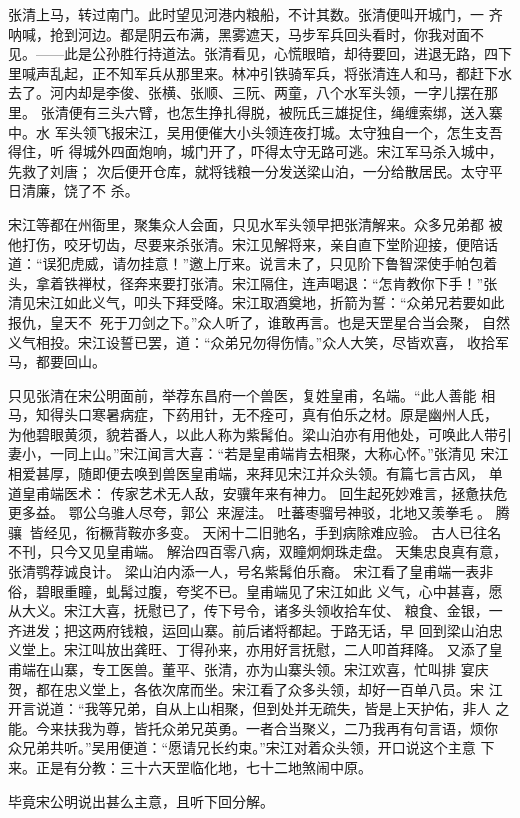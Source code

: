 张清上马，转过南门。此时望见河港内粮船，不计其数。张清便叫开城门，一
齐呐喊，抢到河边。都是阴云布满，黑雾遮天，马步军兵回头看时，你我对面不
见。——此是公孙胜行持道法。张清看见，心慌眼暗，却待要回，进退无路，四下
里喊声乱起，正不知军兵从那里来。林冲引铁骑军兵，将张清连人和马，都赶下水
去了。河内却是李俊、张横、张顺、三阮、两童，八个水军头领，一字儿摆在那里。
张清便有三头六臂，也怎生挣扎得脱，被阮氏三雄捉住，绳缠索绑，送入寨中。水
军头领飞报宋江，吴用便催大小头领连夜打城。太守独自一个，怎生支吾得住，听
得城外四面炮响，城门开了，吓得太守无路可逃。宋江军马杀入城中，先救了刘唐；
次后便开仓库，就将钱粮一分发送梁山泊，一分给散居民。太守平日清廉，饶了不
杀。

宋江等都在州衙里，聚集众人会面，只见水军头领早把张清解来。众多兄弟都
被他打伤，咬牙切齿，尽要来杀张清。宋江见解将来，亲自直下堂阶迎接，便陪话
道：“误犯虎威，请勿挂意！”邀上厅来。说言未了，只见阶下鲁智深使手帕包着
头，拿着铁禅杖，径奔来要打张清。宋江隔住，连声喝退：“怎肯教你下手！”张
清见宋江如此义气，叩头下拜受降。宋江取酒奠地，折箭为誓：“众弟兄若要如此
报仇，皇天不，死于刀剑之下。”众人听了，谁敢再言。也是天罡星合当会聚，
自然义气相投。宋江设誓已罢，道：“众弟兄勿得伤情。”众人大笑，尽皆欢喜，
收拾军马，都要回山。

只见张清在宋公明面前，举荐东昌府一个兽医，复姓皇甫，名端。“此人善能
相马，知得头口寒暑病症，下药用针，无不痊可，真有伯乐之材。原是幽州人氏，
为他碧眼黄须，貌若番人，以此人称为紫髯伯。梁山泊亦有用他处，可唤此人带引
妻小，一同上山。”宋江闻言大喜：“若是皇甫端肯去相聚，大称心怀。”张清见
宋江相爱甚厚，随即便去唤到兽医皇甫端，来拜见宋江并众头领。有篇七言古风，
单道皇甫端医术：
传家艺术无人敌，安骥年来有神力。
回生起死妙难言，拯惫扶危更多益。
鄂公乌骓人尽夸，郭公来渥洼。
吐蕃枣骝号神驳，北地又羡拳毛。
腾骧皆经见，衔橛背鞍亦多变。
天闲十二旧驰名，手到病除难应验。
古人已往名不刊，只今又见皇甫端。
解治四百零八病，双瞳炯炯珠走盘。
天集忠良真有意，张清鹗荐诚良计。
梁山泊内添一人，号名紫髯伯乐裔。
宋江看了皇甫端一表非俗，碧眼重瞳，虬髯过腹，夸奖不已。皇甫端见了宋江如此
义气，心中甚喜，愿从大义。宋江大喜，抚慰已了，传下号令，诸多头领收拾车仗、
粮食、金银，一齐进发；把这两府钱粮，运回山寨。前后诸将都起。于路无话，早
回到梁山泊忠义堂上。宋江叫放出龚旺、丁得孙来，亦用好言抚慰，二人叩首拜降。
又添了皇甫端在山寨，专工医兽。董平、张清，亦为山寨头领。宋江欢喜，忙叫排
宴庆贺，都在忠义堂上，各依次席而坐。宋江看了众多头领，却好一百单八员。宋
江开言说道：“我等兄弟，自从上山相聚，但到处并无疏失，皆是上天护佑，非人
之能。今来扶我为尊，皆托众弟兄英勇。一者合当聚义，二乃我再有句言语，烦你
众兄弟共听。”吴用便道：“愿请兄长约束。”宋江对着众头领，开口说这个主意
下来。正是有分教：三十六天罡临化地，七十二地煞闹中原。

毕竟宋公明说出甚么主意，且听下回分解。